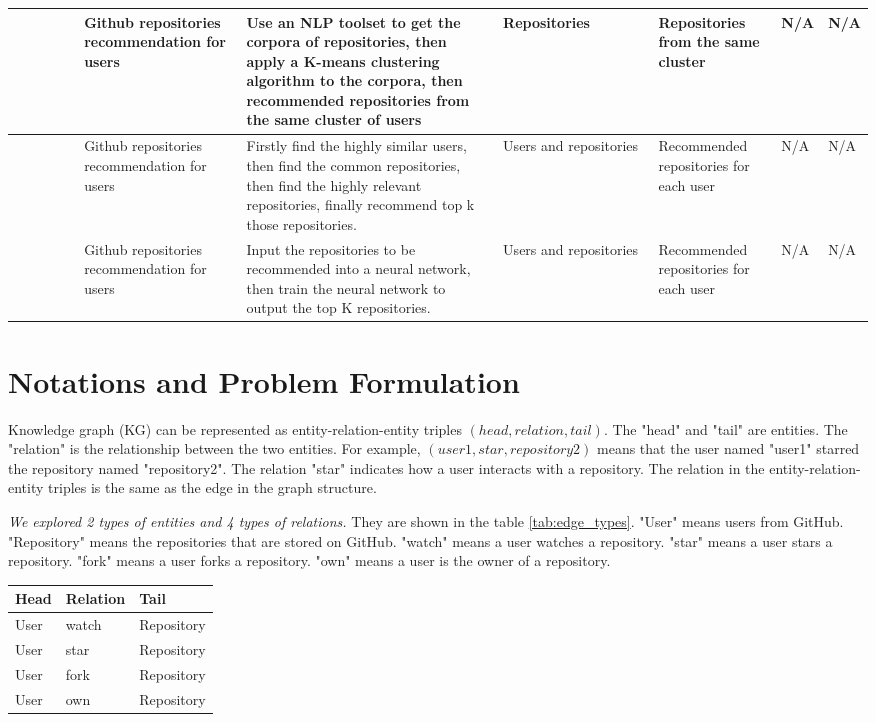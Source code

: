 \documentclass[11pt,twoside]{report}
\begin{document}
\begin{center}
\begin{longtable}{p{0.1\linewidth}p{0.2\linewidth}p{0.35\linewidth}p{0.2\linewidth}p{0.2\linewidth}p{0.05\linewidth}p{0.05\linewidth}}
    \hline
    \cite{portugal_gh4re_nodate} & Github repositories recommendation for users & Use an NLP toolset to get the corpora of repositories, then apply a K-means clustering algorithm to the corpora, then recommended repositories from the same cluster of users & Repositories & Repositories from the same cluster & N/A & N/A \\
    \hline
    \cite{guendouz_recommending_2015} & Github repositories recommendation for users & Firstly find the highly similar users, then find the common repositories, then find the highly relevant repositories, finally recommend top k those repositories. & Users and repositories & Recommended repositories for each user & N/A & N/A \\
    \hline
    \cite{liu_recommending_2018} & Github repositories recommendation for users & Input the repositories to be recommended into a neural network, then train the neural network to output the top K repositories. & Users and repositories & Recommended repositories for each user & N/A & N/A \\
    \hline
    \end{longtable}
    \label{tab:literature_review_matrix}
\end{center}

\chapter{Notations and Problem Formulation}
Knowledge graph (KG) can be represented as entity-relation-entity triples $(head, relation, tail)$. The "head" and "tail" are entities. The "relation" is the relationship between the two entities. For example, $(user1, star, repository2)$ means that the user named "user1" starred the repository named "repository2". The relation "star" indicates how a user interacts with a repository. The relation in the entity-relation-entity triples is the same as the edge in the graph structure.

\textit{We explored 2 types of entities and 4 types of relations.} They are shown in the table \ref{tab:edge_types}. "User" means users from GitHub. "Repository" means the repositories that are stored on GitHub. "watch" means a user watches a repository. "star" means a user stars a repository. "fork" means a user forks a repository. "own" means a user is the owner of a repository. 

\begin{center}
    \begin{tabular}{l | l | l}
    \hline
    Head & Relation & Tail \\
    \hline
    User & watch & Repository \\
    User & star & Repository \\
    User & fork & Repository \\
    User & own & Repository \\
    \end{tabular}
    \label{tab:edge_types}
\end{center}
\end{document}
